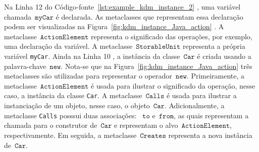 Na Linha 12 do Código-fonte~\ref{lst:example_kdm_instance_2} , uma variável chamada~$\mathtt{myCar}$ é declarada. As metaclasses que representam essa declaração podem ser visualizadas na Figura~\ref{fig:kdm_instance_Java_action} . A metaclasse~$\mathtt{ActionElement}$ representa o significado das operações, por exemplo, uma declaração da variável. A metaclasse~$\mathtt{StorableUnit}$ representa a própria variável \texttt{myCar}. Ainda na Linha 10 , a instância da classe~$\mathtt{Car}$ é criada usando a palavra-chave~$\mathtt{new}$. Nota-se que na Figura~\ref{fig:kdm_instance_Java_action}  três metaclasses são utilizadas para representar o operador~$\mathtt{new}$. Primeiramente, a metaclasse~$\mathtt{ActionElement}$ é usada para ilustrar o significado da operação, nesse caso, a instância da classe \texttt{Car}. A metaclasse~$\mathtt{Calls}$ é usada para ilustrar a instanciação de um objeto, nesse caso, o objeto~$\mathtt{Car}$. Adicionalmente, a metaclasse \texttt{Calls} posssui duas associações: ~$\mathtt{to}$ e~$\mathtt{from}$, as quais representam a chamada para o construtor de~$\mathtt{Car}$ e representam o alvo~$\mathtt{ActionElement}$, respectivamente. Em seguida, a metaclasse~$\mathtt{Creates}$ representa a nova instância de~$\mathtt{Car}$.


